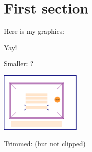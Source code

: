 \documentclass[12pt]{article}
\begin{document}
\section{First section}

Here is my graphics:

\fboxsep=0pt\relax
{}

Yay!

\clearpage

Smaller: ?

\includegraphics[width=4cm]{anothertestgraphics}

\vspace{4cm}
Trimmed: (but not clipped)

\fboxsep=0pt\relax
{}
\end{document}

